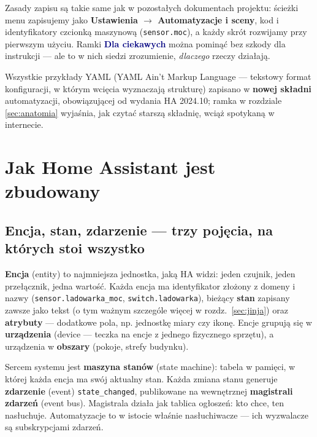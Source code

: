 \documentclass[11pt,a4paper]{article}
\begin{document}
Zasady zapisu są takie same jak w pozostałych dokumentach projektu: ścieżki menu zapisujemy jako \textbf{Ustawienia $\to$ Automatyzacje i sceny}, kod i identyfikatory czcionką maszynową (\texttt{sensor.moc}), a każdy skrót rozwijamy przy pierwszym użyciu. Ramki \textcolor{navy}{\textbf{Dla ciekawych}} można pominąć bez szkody dla instrukcji --- ale to w nich siedzi zrozumienie, \emph{dlaczego} rzeczy działają.

Wszystkie przykłady YAML (YAML Ain't Markup Language --- tekstowy format konfiguracji, w którym wcięcia wyznaczają strukturę) zapisano w \textbf{nowej składni} automatyzacji, obowiązującej od wydania HA 2024.10; ramka w rozdziale \ref{sec:anatomia} wyjaśnia, jak czytać starszą składnię, wciąż spotykaną w internecie.

\section{Jak Home Assistant jest zbudowany}
\label{sec:arch}

\subsection{Encja, stan, zdarzenie --- trzy pojęcia, na których stoi wszystko}

\textbf{Encja} (entity) to najmniejsza jednostka, jaką HA widzi: jeden czujnik, jeden przełącznik, jedna wartość. Każda encja ma identyfikator złożony z domeny i nazwy (\texttt{sensor.ladowarka\_moc}, \texttt{switch.ladowarka}), bieżący \textbf{stan} zapisany zawsze jako tekst (o tym ważnym szczególe więcej w rozdz.~\ref{sec:jinja}) oraz \textbf{atrybuty} --- dodatkowe pola, np. jednostkę miary czy ikonę. Encje grupują się w \textbf{urządzenia} (device --- teczka na encje z jednego fizycznego sprzętu), a urządzenia w \textbf{obszary} (pokoje, strefy budynku).

Sercem systemu jest \textbf{maszyna stanów} (state machine): tabela w pamięci, w której każda encja ma swój aktualny stan. Każda zmiana stanu generuje \textbf{zdarzenie} (event) \texttt{state\_changed}, publikowane na wewnętrznej \textbf{magistrali zdarzeń} (event bus). Magistrala działa jak tablica ogłoszeń: kto chce, ten nasłuchuje. Automatyzacje to w istocie właśnie nasłuchiwacze --- ich wyzwalacze są subskrypcjami zdarzeń.
\end{document}
